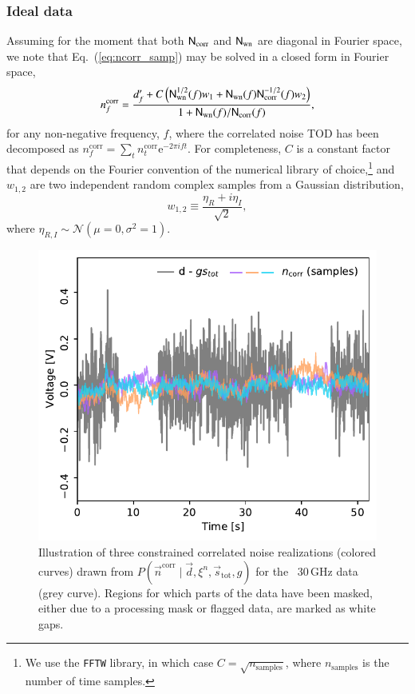 \documentclass{aa}
\begin{document}
\subsubsection{Ideal data}

Assuming for the moment that both $\mathsf{N}_\mathrm{corr}$ and
$\mathsf{N}_\mathrm{wn}$ are diagonal in Fourier space, we note that
Eq.~(\ref{eq:ncorr_samp}) may be solved in a closed form in Fourier
space,
\begin{equation}
  n_f^\mathrm{corr} = \frac{d'_f +
    C\left(\mathsf{N}_\mathrm{wn}^{1/2}(f) w_1 + \mathsf{N}_\mathrm{wn}(f)
    \mathsf{N}_\mathrm{corr}^{-1/2}(f) w_2\right)}{1 +
    \mathsf{N}_\mathrm{wn}(f)/\mathsf{N}_\mathrm{corr}(f)},
  \label{eq:ncorr_fspace}
\end{equation}
for any non-negative frequency, $f$, where the correlated noise TOD has
been decomposed as $n^{\mathrm{corr}}_f = \sum_{t} n^{\mathrm{corr}}_t \mathrm
e^{-2\pi ift}$. For
completeness, $C$ is a constant factor that depends on the Fourier
convention of the numerical library of choice,\footnote{We use the
  \texttt{FFTW} library, in which case $C=\sqrt{n_\mathrm{samples}}$, where
  $n_\mathrm{samples}$ is the number of time samples.} and $w_{1,2}$ are two
independent random complex samples from a Gaussian distribution,
\begin{equation}
w_{1,2} \equiv \frac{\eta_R + i \eta_I}{\sqrt{2}},
\end{equation}
where $\eta_{R,I} \sim \mathcal{N}(\mu = 0, \sigma^2 = 1)$.

\begin{figure}
  \begin{center}
    \includegraphics[width=\linewidth]{figs/ncorr_example_030_det_3_13001_mask.pdf}
  \end{center}
  \caption{Illustration of three constrained correlated noise
    realizations (colored curves) drawn from
    $P(\vec{n}^\mathrm{corr}\mid\vec{d}, \xi^n, \vec{s}_\mathrm{tot}, g)$
    for the \Planck\ 30\,GHz data (grey curve). Regions for which parts
    of the data have been masked, either due to a processing mask or
    flagged data, are marked as white gaps. }
  \label{fig:ncorr}
\end{figure}
\end{document}
